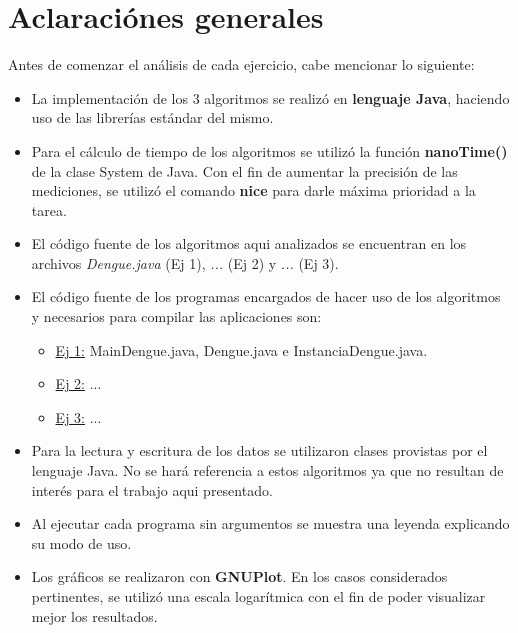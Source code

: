 \documentclass[a4paper,10pt] {article}
\begin{document}
\grupo{}

\maketitle

\bigskip
\section*{Aclaraci\'ones generales}

Antes de comenzar el an\'alisis de cada ejercicio, cabe mencionar lo siguiente:

\begin{itemize}
 \item La implementaci\'on de los 3 algoritmos se realizó en \textbf{lenguaje Java}, haciendo uso de las librer\'ias est\'andar del mismo.
 \item Para el c\'alculo de tiempo de los algoritmos se utiliz\'o la funci\'on \textbf{nanoTime()} de la clase System de Java. Con el fin de aumentar la precisión de las mediciones, se utilizó el comando \textbf{nice} para darle máxima prioridad a la tarea.
 \item El c\'odigo fuente de los algoritmos aqui analizados se encuentran en los archivos \textit{Dengue.java} (Ej 1), \textit{...} (Ej 2) y \textit{...} (Ej 3).
 \item El c\'odigo fuente de los programas encargados de hacer uso de los algoritmos y necesarios para compilar las aplicaciones son:
 \begin{itemize}
    \item \underline{Ej 1:} MainDengue.java, Dengue.java e InstanciaDengue.java.
    \item \underline{Ej 2:} ...
    \item \underline{Ej 3:} ...
  \end{itemize}
 \item Para la lectura y escritura de los datos se utilizaron clases provistas por el lenguaje Java. No se har\'a referencia a estos algoritmos ya que no resultan de inter\'es para el trabajo aqui presentado.
 \item Al ejecutar cada programa sin argumentos se muestra una leyenda explicando su modo de uso.
 \item Los gr\'aficos se realizaron con \textbf{GNUPlot}. En los casos considerados pertinentes, se utiliz\'o una escala logar\'itmica con el fin de poder visualizar mejor los resultados.
\end{itemize}
\end{document}
